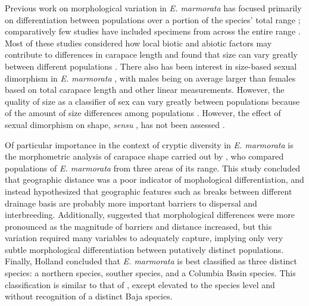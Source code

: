 \documentclass[12pt,letterpaper]{article}
\begin{document}
Previous work on morphological variation in \textit{E. marmorata} has focused primarily on differentiation between populations over a portion of the species' total range \citep{Lubcke2007,Germano2008,Germano2009,Bury2010}; comparatively few studies have included specimens from across the entire range \citep{Holland1992}. Most of these studies considered how local biotic and abiotic factors may contribute to differences in carapace length and found that size can vary greatly between different populations \citep{Lubcke2007,Germano2008,Germano2009}. There also has been interest in size-based sexual dimorphism in \textit{E. marmorata} \citep{Holland1992,Lubcke2007,Germano2009}, with males being on average larger than females based on total carapace length and other linear measurements. However, the quality of size as a classifier of sex can vary greatly between populations \citep{Holland1992} because of the amount of size differences among populations \citep{Lubcke2007,Germano2009}. However, the effect of sexual dimorphism on shape, \textit{sensu} \citet{Kendall1977a}, has not been assessed \citep{Holland1992,Lubcke2007,Germano2008}.

Of particular importance in the context of cryptic diversity in \textit{E. marmorata} is the morphometric analysis of carapace shape carried out by \citet{Holland1992}, who compared populations of \textit{E. marmorata} from three areas of its range. This study concluded that geographic distance was a poor indicator of mophological differentiation, and instead hypothesized that geographic features such as breaks between different drainage basis are probably more important barriers to dispersal and interbreeding. Additionally, \citep{Holland1992} suggested that morphological differences were more pronounced as the magnitude of barriers and distance increased, but this variation required many variables to adequately capture, implying only very subtle morphological differentiation between putatively distinct populations. Finally, Holland concluded that \textit{E. marmorata} is best classified as three distinct species: a northern species, souther species, and a Columbia Basin species. This classification is similar to that of \citet{Seeliger1945}, except elevated to the species level and without recognition of a distinct Baja species. 
\end{document}
